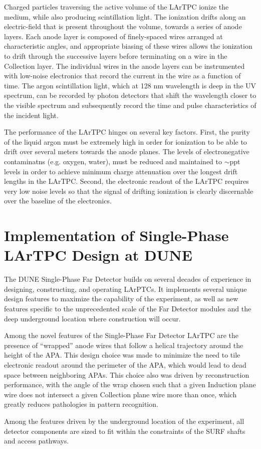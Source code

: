 Charged particles traversing the active volume of the LArTPC ionize the medium,
while also producing scintillation light.  The ionization drifts along
an electric-field that is present throughout the volume, towards a series of
anode layers.  Each anode layer is composed of finely-spaced wires arranged at
characteristic angles, and appropriate biasing of these wires allows the
ionization to drift through the successive layers before terminating on a wire
in the Collection layer.  The individual wires in the anode layers can be
instrumented with low-noise electronics that record the current in the wire as
a function of time.  The argon scintillation light, which at 128 nm wavelength
is deep in the UV spectrum, can be recorded by photon detectors that shift the
wavelength closer to the visible spectrum and subsequently record the time and
pulse characteristics of the incident light.


The performance of the LArTPC hinges on several key factors.  First, the
purity of the liquid argon must be extremely high in order for ionization to
be able to drift over several meters towards the anode planes.  The levels of
electronegative contaminatns (e.g. oxygen, water), must be reduced and
maintained to $\sim$ppt levels in order to achieve minimum charge attenuation
over the longest drift lengths in the LArTPC.   Second, the electronic readout
of the LArTPC requires very low noise levels so that the signal of drifting
ionization is clearly discernable over the baseline of the electronics.  

\section{Implementation of Single-Phase LArTPC Design at DUNE}
\label{sec:fdsp-design-impl}

The DUNE Single-Phase Far Detector builds on several decades of experience in
designing, constructing, and operating LArPTCs.  It implements several
unique design features to maximize the capability of the experiment, as well
as new features specific to the unprecedented scale of the Far Detector
modules and the deep underground location where construction will occur.

Among the novel features of the Single-Phase Far Detector LArTPC are the
presence of ``wrapped'' anode wires that follow a helical trajectory around
the height of the APA.  This design choice was made to minimize the need to
tile electronic readout around the perimeter of the APA, which would lead to
dead space between neighboring APAs.  This choice also was driven by
reconstruction performance, with the angle of the wrap chosen such that a
given Induction plane wire does not intersect a given Collection plane wire
more than once, which greatly reduces pathologies in pattern recognition. 

Among the features driven by the underground location of the experiment, all
detector components are sized to fit within the constraints of the SURF shafts
and access pathways.








